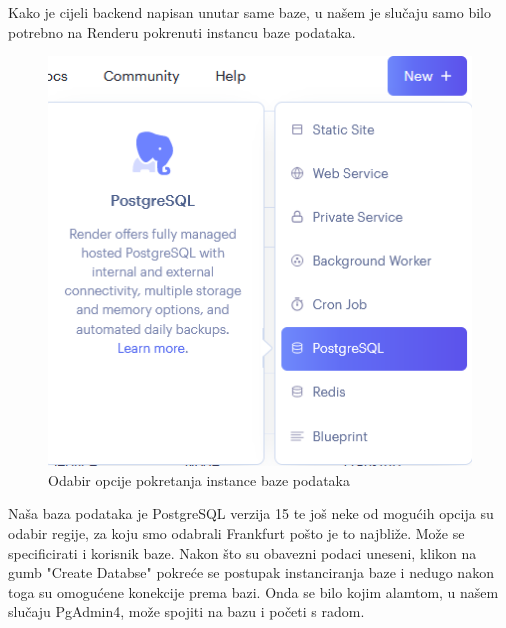 				Kako je cijeli backend napisan unutar same baze, u našem je slučaju samo bilo potrebno na Renderu pokrenuti instancu baze podataka. 
				\begin{figure}[H]
					\centering
					\includegraphics[width=\textwidth]{slike/render_new_instance.png}
					\caption{Odabir opcije pokretanja instance baze podataka}
					\label{fig: Render new instance}
				\end{figure}
				Naša baza podataka je PostgreSQL verzija 15 te još neke od mogućih opcija su odabir regije, za koju smo odabrali Frankfurt pošto je to najbliže. Može se specificirati i korisnik baze. Nakon što su obavezni podaci uneseni, klikon na gumb "Create Databse" pokreće se postupak instanciranja baze i nedugo nakon toga su omogućene konekcije prema bazi. Onda se bilo kojim alamtom, u našem slučaju PgAdmin4, može spojiti na bazu i početi s radom.
